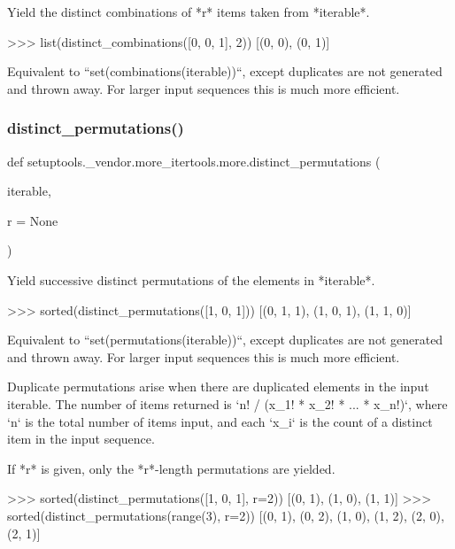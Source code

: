 \begin{DoxyVerb}Yield the distinct combinations of *r* items taken from *iterable*.

    >>> list(distinct_combinations([0, 0, 1], 2))
    [(0, 0), (0, 1)]

Equivalent to ``set(combinations(iterable))``, except duplicates are not
generated and thrown away. For larger input sequences this is much more
efficient.\end{DoxyVerb}
 \mbox{\label{namespacesetuptools_1_1__vendor_1_1more__itertools_1_1more_a133d88653cbeea402678991e251a01ef}} 
\subsubsection{\texorpdfstring{distinct\+\_\+permutations()}{distinct\_permutations()}}
{\footnotesize\ttfamily def setuptools.\+\_\+vendor.\+more\+\_\+itertools.\+more.\+distinct\+\_\+permutations (\begin{DoxyParamCaption}\item[{}]{iterable,  }\item[{}]{r = {\ttfamily None} }\end{DoxyParamCaption})}

\begin{DoxyVerb}Yield successive distinct permutations of the elements in *iterable*.

    >>> sorted(distinct_permutations([1, 0, 1]))
    [(0, 1, 1), (1, 0, 1), (1, 1, 0)]

Equivalent to ``set(permutations(iterable))``, except duplicates are not
generated and thrown away. For larger input sequences this is much more
efficient.

Duplicate permutations arise when there are duplicated elements in the
input iterable. The number of items returned is
`n! / (x_1! * x_2! * ... * x_n!)`, where `n` is the total number of
items input, and each `x_i` is the count of a distinct item in the input
sequence.

If *r* is given, only the *r*-length permutations are yielded.

    >>> sorted(distinct_permutations([1, 0, 1], r=2))
    [(0, 1), (1, 0), (1, 1)]
    >>> sorted(distinct_permutations(range(3), r=2))
    [(0, 1), (0, 2), (1, 0), (1, 2), (2, 0), (2, 1)]\end{DoxyVerb}
 \mbox{\label{namespacesetuptools_1_1__vendor_1_1more__itertools_1_1more_a263804d0fc0b058f793cc590eca76edd}} 
